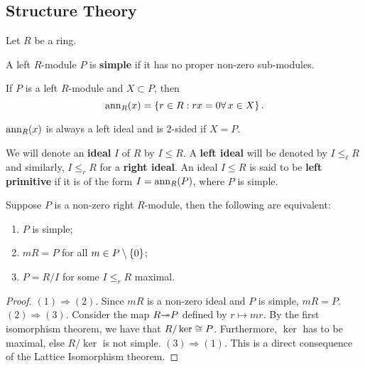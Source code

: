 \subsection{Structure Theory}
Let $R$ be a ring.
\begin{defn}\label{1.4}
A left $R$-module $P$ is \textbf{simple} if it has no proper non-zero sub-modules.
\end{defn}
\begin{defn}\label{1.5}
If $P$ is a left $R$-module and $X \subset P$, then 
$$\operatorname{ann}_R(x) = \left\lbrace r \in R : rx = 0 \forall \, x \in X \right\rbrace.$$
\end{defn}
\begin{remark}\label{1.6}
$\operatorname{ann}_R(x)$ is always a left ideal and is 2-sided if $X = P$.
\end{remark}
\begin{defn}\label{1.7}
We will denote an \textbf{ideal} $I$ of $R$ by $I \leq R$. A \textbf{left ideal} will be denoted by $I \leq_{\ell} R$ and similarly, $I\leq_r R$ for a \textbf{right ideal}. An ideal $I \leq R$ is said to be \textbf{left primitive} if it is of the form $I = \operatorname{ann}_R(P)$, where $P$ is simple.
\end{defn}
\begin{prop}\label{1.8}
Suppose $P$ is a non-zero right $R$-module, then the following are equivalent:
\begin{enumerate}
\item $P$ is simple;
\item $mR = P$ for all $m \in P \setminus \left\lbrace 0 \right\rbrace$;
\item $P = R/I$ for some $I\leq_r R$ maximal.
\end{enumerate}
\end{prop}
\begin{proof}
$(1) \Rightarrow (2)$. Since $mR$ is a non-zero ideal and $P$ is simple, $mR = P$. $(2)\Rightarrow (3).$ Consider the map $R \surj P$ defined by $r \mapsto mr$. By the first isomorphism theorem, we have that $R/\ker \cong P$. Furthermore, $\ker$ has to be maximal, else $R/\ker$ is not simple. $(3) \Rightarrow (1).$ This is a direct consequence of the Lattice Isomorphism theorem.
\end{proof}

